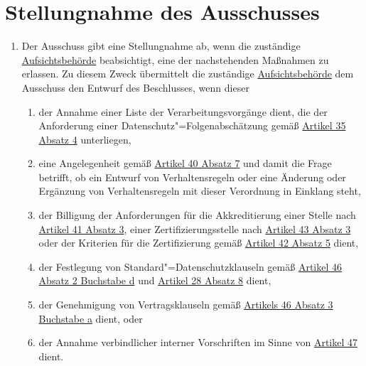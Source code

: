 \chapter{Stellungnahme des Ausschusses}
\label{ch:64}

\begin{enumerate}

  \item Der Ausschuss gibt eine Stellungnahme ab, wenn die zuständige \hyperref[itm:04-21]
   {Aufsichtsbehörde} beabsichtigt, eine der nachstehenden Maßnahmen zu erlassen. Zu diesem Zweck übermittelt die
   zuständige \hyperref[itm:04-21]{Aufsichtsbehörde} dem Ausschuss den Entwurf des Beschlusses, wenn dieser%
  \label{itm:64-1}

  \begin{enumerate}
  
    \item der Annahme einer Liste der Verarbeitungsvorgänge dient, die der Anforderung einer
     Datenschutz"=Folgenabschätzung gemäß \hyperref[itm:35-4]{Artikel 35 Absatz 4} unterliegen,%
    \label{itm:64-1a}

    \item eine Angelegenheit gemäß \hyperref[itm:40-7]{Artikel 40 Absatz 7} und damit die Frage betrifft, ob ein Entwurf
     von Verhaltensregeln oder eine Änderung oder Ergänzung von Verhaltensregeln mit dieser Verordnung in Einklang
     steht,%
    \label{itm:64-1b}

    \item der Billigung der Anforderungen für die Akkreditierung einer Stelle nach \hyperref[itm:41-3]{Artikel 41 Absatz
     3}, einer Zertifizierungsstelle nach \hyperref[itm:43-3]{Artikel 43 Absatz 3} oder der Kriterien für die
     Zertifizierung gemäß \hyperref[itm:42-5]{Artikel 42 Absatz 5} dient,%
    \label{itm:64-1c}

    \item der Festlegung von Standard"=Datenschutzklauseln gemäß \hyperref[itm:46-2d]{Artikel 46 Absatz 2 Buchstabe d}
     und \hyperref[itm:28-8]{Artikel 28 Absatz 8} dient,%
    \label{itm:64-1d}

    \item der Genehmigung von Vertragsklauseln gemäß \hyperref[itm:46-3a]{Artikels 46 Absatz 3 Buchstabe a} dient, oder%
    \label{itm:64-1e}

    \item der Annahme verbindlicher interner Vorschriften im Sinne von \hyperref[ch:47]{Artikel 47} dient.%
    \label{itm:64-1f}


\end{enumerate}
\end{enumerate}
